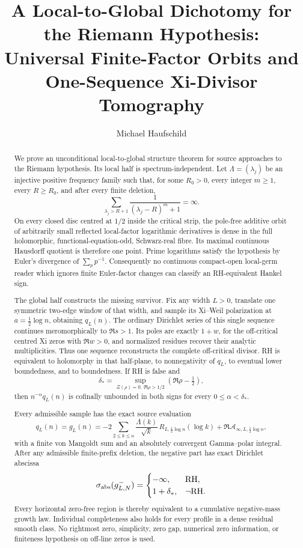 \documentclass[11pt]{article}
\title{A Local-to-Global Dichotomy for the Riemann Hypothesis:\\
Universal Finite-Factor Orbits and One-Sequence Xi-Divisor Tomography}
\author{Michael Haufschild}
\date{}
\newcommand{\cA}{\mathcal A}
\begin{document}
\maketitle

\begin{abstract}
We prove an unconditional local-to-global structure theorem for source approaches to the
Riemann hypothesis.  Its local half is spectrum-independent.  Let
\(\Lambda=(\lambda_j)\) be an injective positive frequency family such that, for some
\(R_0>0\), every integer \(m\ge1\), every \(R\ge R_0\), and after every finite deletion,
\[
 \sum_{\lambda_j>R+1}\frac1{(\lambda_j-R)^m+1}=\infty.
\]
On every closed disc centred at \(1/2\) inside the critical strip, the pole-free additive
orbit of arbitrarily small reflected local-factor logarithmic derivatives is dense in the
full holomorphic, functional-equation-odd, Schwarz-real fibre.  Its maximal continuous
Hausdorff quotient is therefore one point.  Prime logarithms satisfy the hypothesis by
Euler's divergence of \(\sum_p p^{-1}\).  Consequently no continuous compact-open
local-germ reader which ignores finite Euler-factor changes can classify an RH-equivalent
Hankel sign.

The global half constructs the missing survivor.  Fix any width \(L>0\), translate one
symmetric two-edge window of that width, and sample its Xi--Weil polarization at
\(a=\frac12\log n\), obtaining \(q_L(n)\).  The ordinary Dirichlet series of this single
sequence continues meromorphically to \(\Re s>1\).  Its poles are exactly \(1+w\), for the
off-critical centred Xi zeros with \(\Re w>0\), and normalized residues recover their
analytic multiplicities.  Thus one sequence reconstructs the complete off-critical divisor.
RH is equivalent to holomorphy in that half-plane, to nonnegativity of \(q_L\), to eventual
lower boundedness, and to boundedness.  If RH is false and
\[
 \delta_*=\sup_{\Xi(\rho)=0,\ \Re\rho>1/2}(\Re\rho-\tfrac12),
\]
then \(n^{-\alpha}q_L(n)\) is cofinally unbounded in both signs for every
\(0\le\alpha<\delta_*\).

Every admissible sample has the exact source evaluation
\[
 q_L(n)=g_L(n)
 =-2\sum_{2\le k\le n}\frac{\Lambda(k)}{\sqrt{k}}\,
    R_{L,\frac12\log n}(\log k)
   +\Re\cA_{\infty,L,\frac12\log n},
\]
with a finite von Mangoldt sum and an absolutely convergent Gamma--polar integral.
After any admissible finite-prefix deletion, the negative part has exact Dirichlet abscissa
\[
 \sigma_{\rm abs}(g^-_{L,N})=
 \begin{cases}
 -\infty,&\mathrm{RH},\\
 1+\delta_*,&\neg\mathrm{RH}.
 \end{cases}
\]
Every horizontal zero-free region is thereby equivalent to a cumulative negative-mass
growth law.  Individual completeness also holds for every profile in a dense residual
smooth class.  No rightmost zero, simplicity, zero gap, numerical zero information, or
finiteness hypothesis on off-line zeros is used.


\end{abstract}
\end{document}
